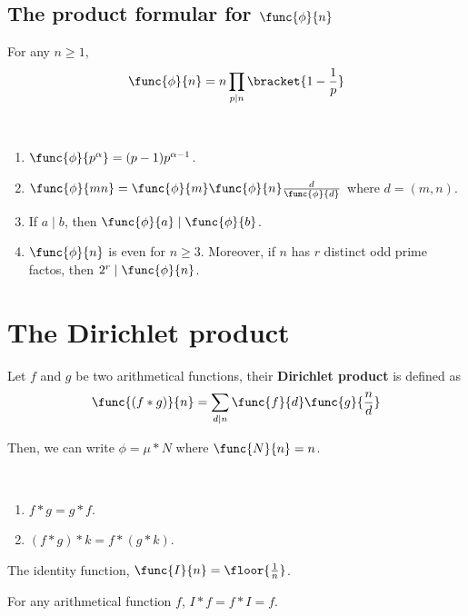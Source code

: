 \subsection{The product formular for \(\func{\phi}{n}\)}
\begin{theorem}
    For any \(n \geq 1\),
    \begin{equation*}
        \func{\phi}{n} = n \prod_{p \mid n}\bracket{1 - \dfrac{1}{p}}
    \end{equation*}
\end{theorem}
\begin{corollary}
    \ 
    \begin{enumerate}
        \item \(\func{\phi}{p^{\alpha}} = (p-1) p^{\alpha - 1}\).
        \item \(\func{\phi}{mn} = \func{\phi}{m} \func{\phi}{n} \frac{d}{\func{\phi}{d}}\) where \(d = (m,n)\).
        \item If \(a \mid b\), then \(\func{\phi}{a} \mid \func{\phi}{b}\).
        \item \(\func{\phi}{n}\) is even for \(n \geq 3\). Moreover, if \(n\) has \(r\) distinct odd prime factos, then \(2^r \mid \func{\phi}{n}\).
    \end{enumerate}
\end{corollary}

\section{The Dirichlet product}
\begin{definition}
    Let \(f\) and \(g\) be two arithmetical functions, their \textbf{Dirichlet product} is defined as 
    \begin{equation*}
        \func{(f \ast g)}{n} = \sum_{d \mid n}\func{f}{d} \func{g}{\frac{n}{d}}
    \end{equation*}
\end{definition}
Then, we can write \(\phi = \mu \ast N\) where \(\func{N}{n}  = n\).
\begin{theorem}
    \ 
    \begin{enumerate}
        \item \(f \ast g = g \ast f\).
        \item \((f \ast g) \ast k = f \ast ( g \ast k)\).
    \end{enumerate}
\end{theorem}
\begin{definition}
    The identity function, \(\func{I}{n} = \floor{\frac{1}{n}}\).
\end{definition}
\begin{theorem}
    For any arithmetical function \(f\), \(I \ast f = f \ast I = f\).
\end{theorem}

